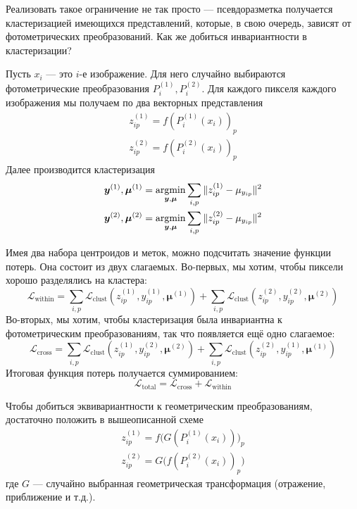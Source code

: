     Реализовать такое ограничение не так просто --- псевдоразметка получается кластеризацией имеющихся представлений,
    которые, в свою очередь, зависят от фотометрических преобразований. 
    Как же добиться инвариантности в кластеризации? 

    Пусть $x_i$ --- это $i$-е изображение.
    Для него случайно выбираются фотометрические преобразования $P^{(1)}_i, P^{(2)}_i$.
    Для каждого пикселя каждого изображения мы получаем по два векторных представления
    \begin{gather}
        z_{ip}^{(1)} = f(P^{(1)}_i(x_i))_p\\
        z_{ip}^{(2)} = f(P^{(2)}_i(x_i))_p
    \end{gather}
    Далее производится кластеризация 
    \begin{gather}
        \bm{y}^{(1)}, \bm{\mu}^{(1)} = \operatorname*{argmin}_{\bm{y}, \bm{\mu}} \sum_{i, p} \Vert z_{ip}^{(1)} - \mu_{y_{ip}} \Vert^2 \\
        \bm{y}^{(2)}, \bm{\mu}^{(2)} = \operatorname*{argmin}_{\bm{y}, \bm{\mu}} \sum_{i, p} \Vert z_{ip}^{(2)} - \mu_{y_{ip}} \Vert^2
    \end{gather}

    Имея два набора центроидов и меток, можно подсчитать значение функции потерь.
    Она состоит из двух слагаемых.
    Во-первых, мы хотим, чтобы пиксели хорошо разделялись на кластера:
    \begin{equation}
        \mathcal{L}_\text{within} = 
        \sum_{i, p} \mathcal{L}_\text{clust}(z^{(1)}_{ip}, y^{(1)}_{ip}, \bm{\mu}^{(1)}) +
        \sum_{i, p} \mathcal{L}_\text{clust}(z^{(2)}_{ip}, y^{(2)}_{ip}, \bm{\mu}^{(2)})
    \end{equation}
    Во-вторых, мы хотим, чтобы кластеризация была инвариантна к фотометрическим преобразованиям, так что появляется ещё одно слагаемое:
    \begin{equation}
        \mathcal{L}_\text{cross} =
        \sum_{i, p} \mathcal{L}_\text{clust}(z^{(1)}_{ip}, y^{(2)}_{ip}, \bm{\mu}^{(2)}) +
        \sum_{i, p} \mathcal{L}_\text{clust}(z^{(2)}_{ip}, y^{(1)}_{ip}, \bm{\mu}^{(1)})
    \end{equation}
    Итоговая функция потерь получается суммированием:
    \begin{equation}
        \mathcal{L}_\text{total} = \mathcal{L}_\text{cross} + \mathcal{L}_\text{within}
    \end{equation}

    Чтобы добиться эквивариантности к геометрическим преобразованиям, достаточно положить в вышеописанной схеме
    \begin{gather}
        z_{ip}^{(1)} = f\bigl(G(P^{(1)}_i(x_i))\bigr)_p\\
        z_{ip}^{(2)} = G\bigl(f(P^{(2)}_i(x_i))_p\bigr)
    \end{gather}
    где $G$ --- случайно выбранная геометрическая трансформация (отражение, приближение и т.д.).

